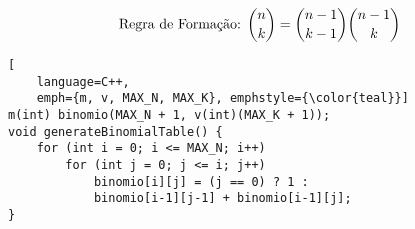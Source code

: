 \begin{displaymath}
	\text{Regra de Formação: }
	\binom{n}{k}=\binom{n-1}{k-1}\binom{n-1}{k}\\\\
\end{displaymath}

\begin{lstlisting}[
    language=C++,
    emph={m, v, MAX_N, MAX_K}, emphstyle={\color{teal}}]
m(int) binomio(MAX_N + 1, v(int)(MAX_K + 1));
void generateBinomialTable() {
    for (int i = 0; i <= MAX_N; i++)
		for (int j = 0; j <= i; j++)
			binomio[i][j] = (j == 0) ? 1 :
            binomio[i-1][j-1] + binomio[i-1][j];
}
\end{lstlisting}